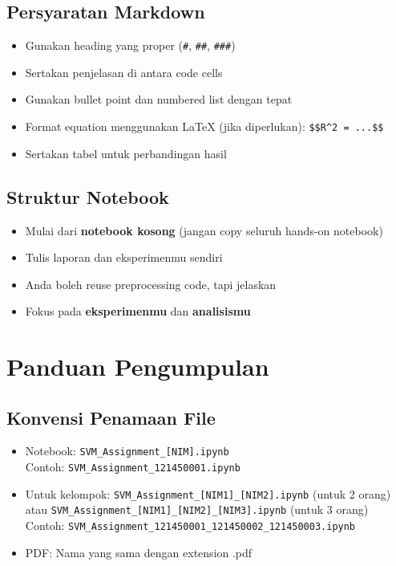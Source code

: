 \documentclass[12pt,a4paper]{article}
\begin{document}
\subsection{Persyaratan Markdown}
\begin{itemize}
    \item Gunakan heading yang proper (\texttt{\#}, \texttt{\#\#}, \texttt{\#\#\#})
    \item Sertakan penjelasan di antara code cells
    \item Gunakan bullet point dan numbered list dengan tepat
    \item Format equation menggunakan LaTeX (jika diperlukan): \verb|$$R^2 = ...$$|
    \item Sertakan tabel untuk perbandingan hasil
\end{itemize}

\subsection{Struktur Notebook}
\begin{itemize}
    \item Mulai dari \textbf{notebook kosong} (jangan copy seluruh hands-on notebook)
    \item Tulis laporan dan eksperimenmu sendiri
    \item Anda boleh reuse preprocessing code, tapi jelaskan
    \item Fokus pada \textbf{eksperimenmu} dan \textbf{analisismu}
\end{itemize}

\section{Panduan Pengumpulan}

\subsection{Konvensi Penamaan File}
\begin{itemize}
    \item Notebook: \texttt{SVM\_Assignment\_[NIM].ipynb} \\
    Contoh: \texttt{SVM\_Assignment\_121450001.ipynb}
    \item Untuk kelompok: \texttt{SVM\_Assignment\_[NIM1]\_[NIM2].ipynb} (untuk 2 orang) atau \texttt{SVM\_Assignment\_[NIM1]\_[NIM2]\_[NIM3].ipynb} (untuk 3 orang) \\
    Contoh: \texttt{SVM\_Assignment\_121450001\_121450002\_121450003.ipynb}
    \item PDF: Nama yang sama dengan extension .pdf
\end{itemize}
\end{document}
